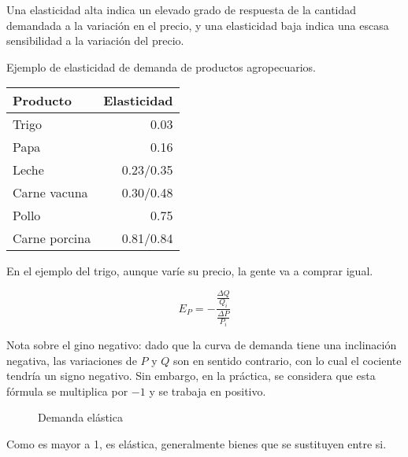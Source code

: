 Una elasticidad alta indica un elevado grado de respuesta de la cantidad demandada a la variación en el precio,
y una elasticidad baja indica una escasa sensibilidad a la variación del precio.

Ejemplo de elasticidad de demanda de productos agropecuarios.

\begin{table}[h!]
    \centering
    \begin{tabular}{lr}
        \hline
        Producto      & Elasticidad \\
        \hline
        Trigo         & 0.03        \\
        Papa          & 0.16        \\
        Leche         & 0.23/0.35   \\
        Carne vacuna  & 0.30/0.48   \\
        Pollo         & 0.75        \\
        Carne porcina & 0.81/0.84   \\
        \hline
    \end{tabular}
\end{table}

En el ejemplo del trigo,
aunque varíe su precio,
la gente va a comprar igual.

\begin{equation*}
    E_P = -\frac{\frac{\Delta Q}{Q_i}}{\frac{\Delta P}{P_i}}
\end{equation*}

Nota sobre el gino negativo:
dado que la curva de demanda tiene una inclinación negativa,
las variaciones de \(P\) y \(Q\) son en sentido contrario,
con lo cual el cociente tendría un signo negativo.
Sin embargo, en la práctica, se considera que esta fórmula se multiplica por \(-1\)
y se trabaja en positivo.

\begin{figure}[h!]
    \centering
    \caption{Demanda elástica}
\end{figure}

Como es mayor a 1, es elástica, generalmente bienes que se sustituyen entre si.

